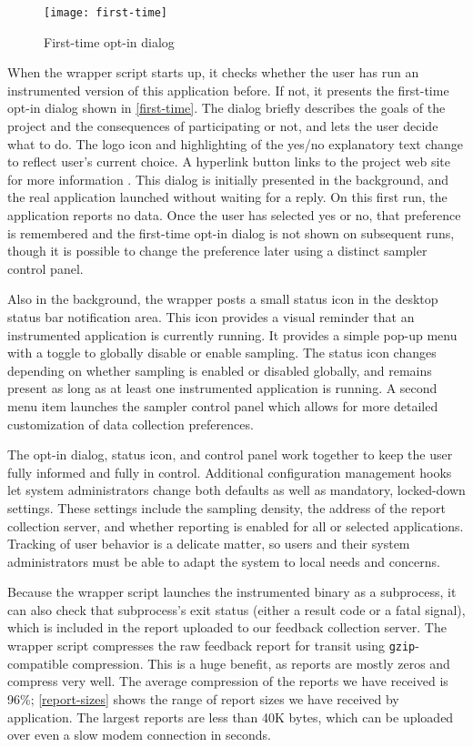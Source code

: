 \documentclass[10pt,twocolumn]{article}
\begin{document}
\begin{figure}
  \centering
  \texttt{[image: first-time]}
  \caption{First-time opt-in dialog}
  \label{first-time}
\end{figure}

When the wrapper script starts up, it checks whether the user has run
an instrumented version of this application before.  If not, it
presents the first-time opt-in dialog shown in
\autoref{first-time}. The dialog briefly describes the goals of the
project and the consequences of participating or not, and lets the
user decide what to do.  The logo icon and highlighting of the yes/no
explanatory text change to reflect user's current choice.  A hyperlink
button links to the project web site for more information
\cite{Liblit:CBIP}.  This
dialog is initially presented in the background, and the real
application launched without waiting for a reply.  On this first run,
the application reports no data. Once the user has selected yes or no,
that preference is remembered and the first-time opt-in dialog is not
shown on subsequent runs, though it is possible to change the
preference later using a distinct sampler control panel.

Also in the background, the wrapper posts a small status icon in
the desktop status bar notification area.  This icon provides a
visual reminder that an instrumented application is currently
running. It provides a simple pop-up menu with a toggle to globally
disable or enable sampling.  The status icon changes depending on
whether sampling is enabled or disabled globally, and remains present
as long as at least one instrumented application is running.  A second
menu item launches the sampler control panel which allows for
more detailed customization of data collection preferences.

The opt-in dialog, status icon, and control panel work together to
keep the user fully informed and fully in control.  Additional
configuration management hooks let system administrators change both
defaults as well as mandatory, locked-down settings.  These settings
include the sampling density, the address of the report collection
server, and whether reporting is enabled for all or selected
applications.  Tracking of user behavior is a delicate matter, so
users and their system administrators must be able to adapt the system
to local needs and concerns.

Because the wrapper script launches the instrumented binary as a
subprocess, it can also check that subprocess's exit status (either a
result code or a fatal signal), which is included in the report
uploaded to our feedback collection server.
The wrapper script compresses the raw feedback report for transit
using \texttt{gzip}-compatible compression.  This is a huge benefit, as reports
are mostly zeros and compress very well.  The average compression
of the reports we have received is 96\%; \autoref{report-sizes} shows
the range of report sizes we have received by application.  
The largest reports are less than 40K bytes, which can be uploaded
over even a slow modem connection in seconds.
\end{document}
